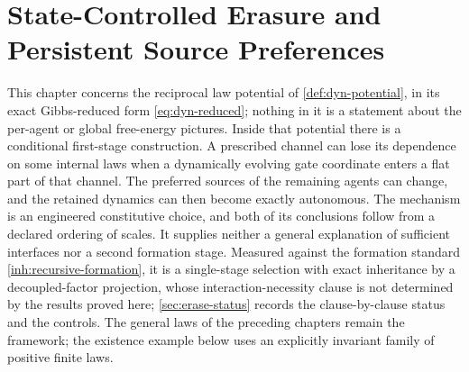 \chapter{State-Controlled Erasure and Persistent Source Preferences}
\label{ch:smooth-erasure}

This chapter concerns the reciprocal law potential of \cref{def:dyn-potential}, in its exact Gibbs-reduced form \cref{eq:dyn-reduced}; nothing in it is a statement about the per-agent or global free-energy pictures. Inside that potential there is a conditional first-stage construction. A prescribed channel can lose its dependence on some internal laws when a dynamically evolving gate coordinate enters a flat part of that channel. The preferred sources of the remaining agents can change, and the retained dynamics can then become exactly autonomous. The mechanism is an engineered constitutive choice, and both of its conclusions follow from a declared ordering of scales. It supplies neither a general explanation of sufficient interfaces nor a second formation stage. Measured against the formation standard \cref{inh:recursive-formation}, it is a single-stage selection with exact inheritance by a decoupled-factor projection, whose interaction-necessity clause is not determined by the results proved here; \cref{sec:erase-status} records the clause-by-clause status and the controls. The general laws of the preceding chapters remain the framework; the existence example below uses an explicitly invariant family of positive finite laws.

